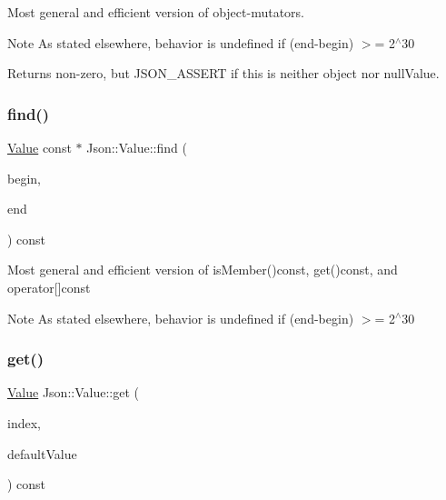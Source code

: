 Most general and efficient version of object-\/mutators. \begin{DoxyNote}{Note}
As stated elsewhere, behavior is undefined if (end-\/begin) $>$= 2$^\wedge$30 
\end{DoxyNote}
\begin{DoxyReturn}{Returns}
non-\/zero, but J\+S\+O\+N\+\_\+\+A\+S\+S\+E\+RT if this is neither object nor null\+Value. 
\end{DoxyReturn}
\mbox{\label{classJson_1_1Value_afb007b9ce9b2cf9d5f667a07e5e0349f}} 
\subsubsection{\texorpdfstring{find()}{find()}}
{\footnotesize\ttfamily \hyperlink{classJson_1_1Value}{Value} const  $\ast$ Json\+::\+Value\+::find (\begin{DoxyParamCaption}\item[{char const $\ast$}]{begin,  }\item[{char const $\ast$}]{end }\end{DoxyParamCaption}) const}

Most general and efficient version of is\+Member()const, get()const, and operator\mbox{[}\mbox{]}const \begin{DoxyNote}{Note}
As stated elsewhere, behavior is undefined if (end-\/begin) $>$= 2$^\wedge$30 
\end{DoxyNote}
\mbox{\label{classJson_1_1Value_a034eb7bf85a44fa759bdaa232788ca66}} 
\subsubsection{\texorpdfstring{get()}{get()}\hspace{0.1cm}{\footnotesize\ttfamily [1/4]}}
{\footnotesize\ttfamily \hyperlink{classJson_1_1Value}{Value} Json\+::\+Value\+::get (\begin{DoxyParamCaption}\item[{Array\+Index}]{index,  }\item[{const \hyperlink{classJson_1_1Value}{Value} \&}]{default\+Value }\end{DoxyParamCaption}) const}

